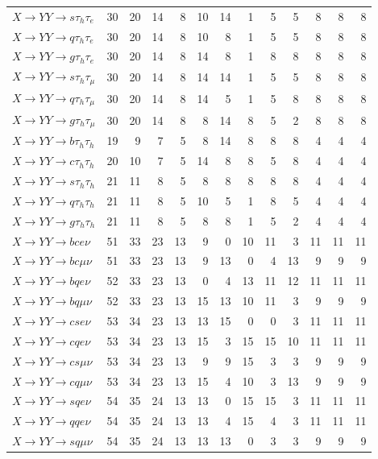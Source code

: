 {\begin{longtable}{l rrrrrrrrrrrr}
$X\to YY\to s\tau_h\tau_e$ & 30 & 20 & 14 & 8 & 10 & 14 & 1 & 5 & 5 & 8 & 8 & 8 \\
$X\to YY\to q\tau_h\tau_e$ & 30 & 20 & 14 & 8 & 10 & 8 & 1 & 5 & 5 & 8 & 8 & 8 \\
$X\to YY\to g\tau_h\tau_e$ & 30 & 20 & 14 & 8 & 14 & 8 & 1 & 8 & 8 & 8 & 8 & 8 \\
$X\to YY\to s\tau_h\tau_\mu$ & 30 & 20 & 14 & 8 & 14 & 14 & 1 & 5 & 5 & 8 & 8 & 8 \\
$X\to YY\to q\tau_h\tau_\mu$ & 30 & 20 & 14 & 8 & 14 & 5 & 1 & 5 & 8 & 8 & 8 & 8 \\
$X\to YY\to g\tau_h\tau_\mu$ & 30 & 20 & 14 & 8 & 8 & 14 & 8 & 5 & 2 & 8 & 8 & 8 \\
\addlinespace[2pt]
$X\to YY\to b\tau_h\tau_h$ & 19 & 9 & 7 & 5 & 8 & 14 & 8 & 8 & 8 & 4 & 4 & 4 \\
$X\to YY\to c\tau_h\tau_h$ & 20 & 10 & 7 & 5 & 14 & 8 & 8 & 5 & 8 & 4 & 4 & 4 \\
$X\to YY\to s\tau_h\tau_h$ & 21 & 11 & 8 & 5 & 8 & 8 & 8 & 8 & 8 & 4 & 4 & 4 \\
$X\to YY\to q\tau_h\tau_h$ & 21 & 11 & 8 & 5 & 10 & 5 & 1 & 8 & 5 & 4 & 4 & 4 \\
$X\to YY\to g\tau_h\tau_h$ & 21 & 11 & 8 & 5 & 8 & 8 & 1 & 5 & 2 & 4 & 4 & 4 \\
\addlinespace[2pt]
$X\to YY\to bce\nu$ & 51 & 33 & 23 & 13 & 9 & 0 & 10 & 11 & 3 & 11 & 11 & 11 \\
$X\to YY\to bc\mu\nu$ & 51 & 33 & 23 & 13 & 9 & 13 & 0 & 4 & 13 & 9 & 9 & 9 \\
$X\to YY\to bqe\nu$ & 52 & 33 & 23 & 13 & 0 & 4 & 13 & 11 & 12 & 11 & 11 & 11 \\
$X\to YY\to bq\mu\nu$ & 52 & 33 & 23 & 13 & 15 & 13 & 10 & 11 & 3 & 9 & 9 & 9 \\
$X\to YY\to cse\nu$ & 53 & 34 & 23 & 13 & 13 & 15 & 0 & 0 & 3 & 11 & 11 & 11 \\
$X\to YY\to cqe\nu$ & 53 & 34 & 23 & 13 & 15 & 3 & 15 & 15 & 10 & 11 & 11 & 11 \\
$X\to YY\to cs\mu\nu$ & 53 & 34 & 23 & 13 & 9 & 9 & 15 & 3 & 3 & 9 & 9 & 9 \\
$X\to YY\to cq\mu\nu$ & 53 & 34 & 23 & 13 & 15 & 4 & 10 & 3 & 13 & 9 & 9 & 9 \\
$X\to YY\to sqe\nu$ & 54 & 35 & 24 & 13 & 13 & 0 & 15 & 15 & 3 & 11 & 11 & 11 \\
$X\to YY\to qqe\nu$ & 54 & 35 & 24 & 13 & 13 & 4 & 15 & 4 & 3 & 11 & 11 & 11 \\
$X\to YY\to sq\mu\nu$ & 54 & 35 & 24 & 13 & 13 & 13 & 0 & 3 & 3 & 9 & 9 & 9 \\

\end{longtable}}
